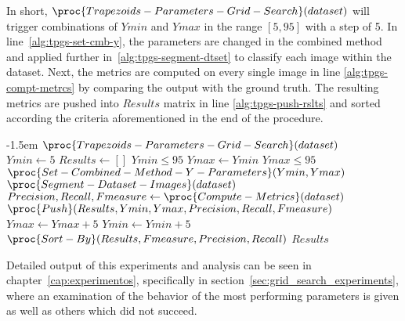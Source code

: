 In short, $\proc{Trapezoids-Parameters-Grid-Search}(dataset)$ will trigger combinations of $Ymin$ and $Ymax$ in the range $[5, 95]$ with a step of 5. In line~\ref{alg:tpgs-set-cmb-y}, the parameters are changed in the combined method and applied further in~\ref{alg:tpgs-segment-dtset} to classify each image within the dataset. Next, the metrics are computed on every single image in line \ref{alg:tpgs-compt-metrcs} by comparing the output with the ground truth. The resulting metrics are pushed into $Results$ matrix in line \ref{alg:tpgs-push-rslts} and sorted according the criteria aforementioned in the end of the procedure.

\begin{codebox}
\kern-1.5em $\proc{Trapezoids-Parameters-Grid-Search}(dataset)$\\
\li $Ymin \gets 5$
\li $Results \gets []$
\li \While $Ymin \leq 95$
\li \Do
        $Ymax \gets Ymin$
\li     \While $Ymax \leq 95$
\li     \Do
            $\proc{Set-Combined-Method-Y-Parameters}(Ymin, Ymax)$ \label{alg:tpgs-set-cmb-y}
\li         $\proc{Segment-Dataset-Images}(dataset)$    \label{alg:tpgs-segment-dtset}
\li         $Precision, Recall, Fmeasure \gets \proc{Compute-Metrics}(dataset)$ \label{alg:tpgs-compt-metrcs}
\li         $\proc{Push}(Results, Ymin, Ymax, Precision, Recall, Fmeasure)$ \label{alg:tpgs-push-rslts}
\li\li      $Ymax \gets Ymax + 5$
        \End
\li      $Ymin \gets Ymin + 5$
    \End
\li
\li $\proc{Sort-By}(Results, Fmeasure, Precision, Recall)$
\li \Return $Results$
\end{codebox}

Detailed output of this experiments and analysis can be seen in chapter~\ref{cap:experimentos}, specifically in section~\ref{sec:grid_search_experiments}, where an examination of the behavior of the most performing parameters is given as well as others which did not succeed.